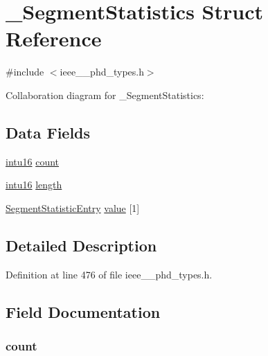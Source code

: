 \hypertarget{struct___segment_statistics}{}\section{\+\_\+\+Segment\+Statistics Struct Reference}
\label{struct___segment_statistics}


{\ttfamily \#include $<$ieee\+\_\+\_\+phd\+\_\+types.\+h$>$}



Collaboration diagram for \+\_\+\+Segment\+Statistics\+:
\subsection*{Data Fields}
\begin{DoxyCompactItemize}
\item 
\hyperlink{ieee__11073__phd__types_8h_a3561595d2aa7416532e1c9910abd076d}{intu16} \hyperlink{struct___segment_statistics_abf6db060ae8e224764b0f867fb135ecd}{count}
\item 
\hyperlink{ieee__11073__phd__types_8h_a3561595d2aa7416532e1c9910abd076d}{intu16} \hyperlink{struct___segment_statistics_a3743679e4ff85e3e1b3fc2e59973fbb3}{length}
\item 
\hyperlink{ieee__11073__phd__types_8h_ab4723b5fade7b8933590d7fc3d86b5ff}{Segment\+Statistic\+Entry} \hyperlink{struct___segment_statistics_adbb7016834e72a9cad0fd83e016a6fd6}{value} \mbox{[}1\mbox{]}
\end{DoxyCompactItemize}


\subsection{Detailed Description}


Definition at line 476 of file ieee\+\_\+\_\+phd\+\_\+types.\+h.



\subsection{Field Documentation}
\hypertarget{struct___segment_statistics_abf6db060ae8e224764b0f867fb135ecd}{}
\subsubsection[{count}]{ count}\label{struct___segment_statistics_abf6db060ae8e224764b0f867fb135ecd}


